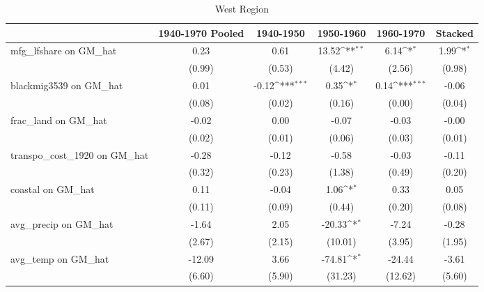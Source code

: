 \begin{table}[htbp]\centering
\def\sym#1{\ifmmode^{#1}\else\(^{#1}\)\fi}
\caption{West Region}
\begin{tabular}{l*{5}{c}}
\toprule
                &\multicolumn{1}{c}{1940-1970 Pooled}&\multicolumn{1}{c}{1940-1950}&\multicolumn{1}{c}{1950-1960}&\multicolumn{1}{c}{1960-1970}&\multicolumn{1}{c}{Stacked}\\
\midrule
mfg\_lfshare on GM\_hat&     0.23         &     0.61         &    13.52\sym{**} &     6.14\sym{*}  &     1.99\sym{*}  \\
                &   (0.99)         &   (0.53)         &   (4.42)         &   (2.56)         &   (0.98)         \\
\addlinespace
blackmig3539 on GM\_hat&     0.01         &    -0.12\sym{***}&     0.35\sym{*}  &     0.14\sym{***}&    -0.06         \\
                &   (0.08)         &   (0.02)         &   (0.16)         &   (0.00)         &   (0.04)         \\
\addlinespace
frac\_land on GM\_hat&    -0.02         &     0.00         &    -0.07         &    -0.03         &    -0.00         \\
                &   (0.02)         &   (0.01)         &   (0.06)         &   (0.03)         &   (0.01)         \\
\addlinespace
transpo\_cost\_1920 on GM\_hat&    -0.28         &    -0.12         &    -0.58         &    -0.03         &    -0.11         \\
                &   (0.32)         &   (0.23)         &   (1.38)         &   (0.49)         &   (0.20)         \\
\addlinespace
coastal on GM\_hat&     0.11         &    -0.04         &     1.06\sym{*}  &     0.33         &     0.05         \\
                &   (0.11)         &   (0.09)         &   (0.44)         &   (0.20)         &   (0.08)         \\
\addlinespace
avg\_precip on GM\_hat&    -1.64         &     2.05         &   -20.33\sym{*}  &    -7.24         &    -0.28         \\
                &   (2.67)         &   (2.15)         &  (10.01)         &   (3.95)         &   (1.95)         \\
\addlinespace
avg\_temp on GM\_hat&   -12.09         &     3.66         &   -74.81\sym{*}  &   -24.44         &    -3.61         \\
                &   (6.60)         &   (5.90)         &  (31.23)         &  (12.62)         &   (5.60)         \\

\end{tabular}
\end{table}
